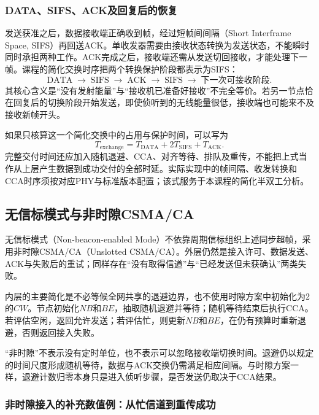 \subsubsection{DATA、SIFS、ACK及回复后的恢复}

发送获准之后，数据接收端正确收到帧，经过短帧间间隔（Short Interframe Space, SIFS）再回送ACK。单收发器需要由接收状态转换为发送状态，不能瞬时同时承担两种工作。ACK完成之后，接收端还需从发送切回接收，才能处理下一帧。课程的简化交换时序把两个转换保护阶段都表示为SIFS：
\begin{equation}
 \mathrm{DATA}\;\longrightarrow\;\mathrm{SIFS}\;
 \longrightarrow\;\mathrm{ACK}\;\longrightarrow\;
 \mathrm{SIFS}\;\longrightarrow\;\text{下一次可接收阶段}.
\end{equation}
其核心含义是“没有发射能量”与“接收机已准备好接收”不完全等价。若另一节点恰在回复后的切换阶段开始发送，即使侦听到的无线能量很低，接收端也可能来不及接收新帧开头。

如果只核算这一个简化交换中的占用与保护时间，可以写为
\begin{equation}
 T_{\mathrm{exchange}}=T_{\mathrm{DATA}}+
 2T_{\mathrm{SIFS}}+T_{\mathrm{ACK}}.
\end{equation}
完整交付时间还应加入随机退避、CCA、对齐等待、排队及重传，不能把上式当作从上层产生数据到成功交付的全部时延。实际实现中的帧间隔、收发转换和CCA时序须按对应PHY与标准版本配置；该式服务于本课程的简化半双工分析。

\subsection{无信标模式与非时隙CSMA/CA}

无信标模式（Non-beacon-enabled Mode）不依靠周期信标组织上述同步超帧，采用非时隙CSMA/CA（Unslotted CSMA/CA）。外层仍然是接入许可、数据发送、ACK与失败后的重试；同样存在“没有取得信道”与“已经发送但未获确认”两类失败。

内层的主要简化是不必等候全网共享的退避边界，也不使用时隙方案中初始化为2的$CW$。节点初始化$NB$和$BE$，抽取随机退避并等待；随机等待结束后执行CCA。若评估空闲，返回允许发送；若评估忙，则更新$NB$和$BE$，在仍有预算时重新退避，否则返回接入失败。

“非时隙”不表示没有定时单位，也不表示可以忽略接收端切换时间。退避仍以规定的时间尺度形成随机等待，数据与ACK交换仍需满足相应间隔。与时隙方案一样，退避计数归零本身只是进入侦听步骤，是否发送仍取决于CCA结果。

\subsubsection{非时隙接入的补充数值例：从忙信道到重传成功}

